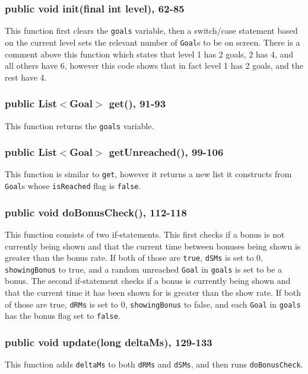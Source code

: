 \documentclass[12pt]{article}
\begin{document}
\subsubsection{public void init(final int level), 62-85}
This function first clears the \verb|goals| variable, then a switch/case statement based on the current level sets the relevant number of \verb|Goal|s to be on screen.
There is a comment above this function which states that level 1 has 2 goals, 2 has 4, and all others have 6, however this code shows that in fact level 1 has 2 goals, and the rest have 4.

\subsubsection{public List$<$Goal$>$ get(), 91-93}
This function returns the \verb|goals| variable.

\subsubsection{public List$<$Goal$>$ getUnreached(), 99-106}
This function is similar to \verb|get|, however it returns a new list it constructs from \verb|Goal|s whose \verb|isReached| flag is \verb|false|.

\subsubsection{public void doBonusCheck(), 112-118}
This function consists of two if-statements.
This first checks if a bonus is not currently being shown and that the current time between bonuses being shown is greater than the bonus rate.
If both of those are \verb|true|, \verb|dSMs| is set to 0, \verb|showingBonus| to true, and a random unreached \verb|Goal| in \verb|goals| is set to be a bonus.
The second if-statement checks if a bonus is currently being shown and that the current time it has been shown for is greater than the show rate.
If both of those are true, \verb|dRMs| is set to 0, \verb|showingBonus| to false, and each \verb|Goal| in \verb|goals| has the bonus flag set to \verb|false|.

\subsubsection{public void update(long deltaMs), 129-133}
This function adds \verb|deltaMs| to both \verb|dRMs| and \verb|dSMs|, and then runs \verb|doBonusCheck|.
\end{document}
